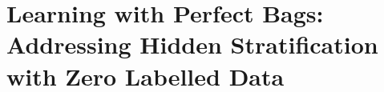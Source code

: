 \chapter{Learning with Perfect Bags: Addressing Hidden Stratification with Zero Labelled Data}\label{ch:paper3}


%







%


